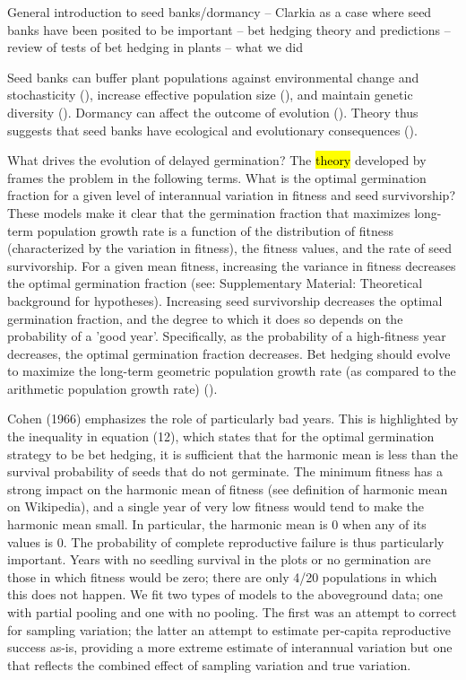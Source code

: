 \documentclass[12pt, oneside, titlepage]{article}   	%
\begin{document}
General introduction to seed banks/dormancy -- Clarkia as a case where seed banks have been posited to be important -- bet hedging theory and predictions -- review of tests of bet hedging in plants -- what we did

Seed banks can buffer plant populations against environmental change and stochasticity (\cite{eager2014,paniw2017}), increase effective population size (\cite{nunney2002,waples2006}), and maintain genetic diversity (\cite{mccue1998b}). Dormancy can affect the outcome of evolution (\cite{ritland1983,heinrich2018}). Theory thus suggests that seed banks have ecological and evolutionary consequences (\cite{evans2005}). 

What drives the evolution of delayed germination? The \hl{theory} developed by \cite{cohen1966} frames the problem in the following terms. What is the optimal germination fraction for a given level of interannual variation in fitness and seed survivorship? These models make it clear that the germination fraction that maximizes long-term population growth rate is a function of the distribution of fitness (characterized by the variation in fitness), the fitness values, and the rate of seed survivorship. For a given mean fitness, increasing the variance in fitness decreases the optimal germination fraction (see: Supplementary Material: Theoretical background for hypotheses). Increasing seed survivorship decreases the optimal germination fraction, and the degree to which it does so depends on the probability of a 'good year'. Specifically, as the probability of a high-fitness year decreases, the optimal germination fraction decreases. Bet hedging should evolve to maximize the long-term geometric population growth rate (as compared to the arithmetic population growth rate) (\cite{cohen1966,cohen1968,ellner1985,ellner1985a}). 

Cohen (1966) emphasizes the role of particularly bad years. This is highlighted by the inequality in equation (12), which states that for the optimal germination strategy to be bet hedging, it is sufficient that the harmonic mean is less than the survival probability of seeds that do not germinate. The minimum fitness has a strong impact on the harmonic mean of fitness (see definition of harmonic mean on Wikipedia), and a single year of very low fitness would tend to make the harmonic mean small. In particular, the harmonic mean is 0 when any of its values is 0. The probability of complete reproductive failure is thus particularly important. Years with no seedling survival in the plots or no germination are those in which fitness would be zero; there are only 4/20 populations in which this does not happen. We fit two types of models to the aboveground data; one with partial pooling and one with no pooling. The first was an attempt to correct for sampling variation; the latter an attempt to estimate per-capita reproductive success as-is, providing a more extreme estimate of interannual variation but one that reflects the combined effect of sampling variation and true variation.
\end{document}

